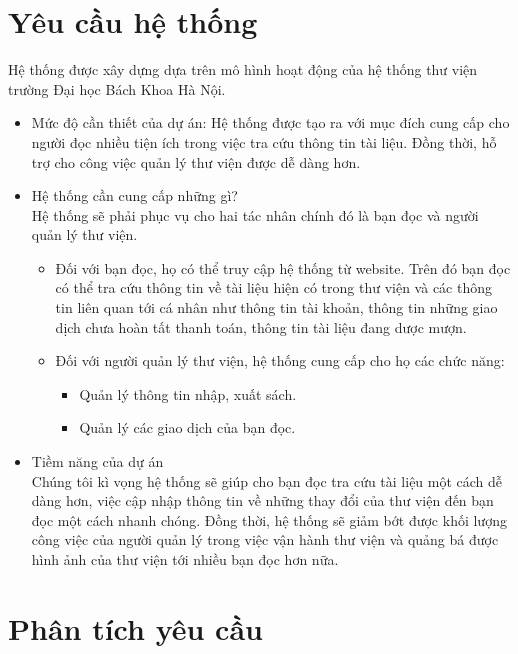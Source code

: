 \documentclass[12pt]{report}
\begin{document}
\section{Yêu cầu hệ thống}
Hệ thống được xây dựng dựa trên mô hình hoạt động của hệ thống thư viện trường Đại học Bách Khoa Hà Nội.	 
\begin{itemize}
    \item Mức độ cần thiết của dự án: Hệ thống được tạo ra với mục đích cung cấp cho người đọc nhiều tiện ích trong 
        việc tra cứu thông tin tài liệu. Đồng thời, hỗ trợ cho công việc quản lý thư viện được dễ dàng hơn.	 
    \item Hệ thống cần cung cấp những gì?	 \\
        Hệ thống sẽ phải phục vụ cho hai tác nhân chính đó là bạn đọc và người quản lý thư viện.
        \begin{itemize}
            \item Đối với bạn đọc, họ có thể truy cập hệ thống từ website. 
            Trên đó bạn đọc có thể tra cứu thông tin về tài liệu hiện có trong thư 
            viện và các thông tin liên quan tới cá nhân như thông tin tài khoản, 
            thông tin những giao dịch chưa hoàn tất thanh toán, thông tin tài liệu đang dược mượn.
            \item Đối với người quản lý thư viện, hệ thống cung cấp cho họ các chức năng:
                \begin{itemize}
                    \item Quản lý thông tin nhập, xuất sách.
                    \item Quản lý các giao dịch của bạn đọc.
                \end{itemize}
        \end{itemize}
    \item Tiềm năng của dự án \\
        Chúng tôi kì vọng hệ thống sẽ giúp cho bạn đọc tra cứu tài liệu một cách dễ dàng hơn, 
        việc cập nhập thông tin về những thay đổi của thư viện đến bạn đọc một cách nhanh chóng. 
        Đồng thời, hệ thống sẽ giảm bớt được khối lượng công việc của người quản lý trong việc 
        vận hành thư viện và quảng bá được hình ảnh của thư viện tới nhiều bạn đọc hơn nữa.
\end{itemize}

\section{Phân tích yêu cầu}
\end{document}
